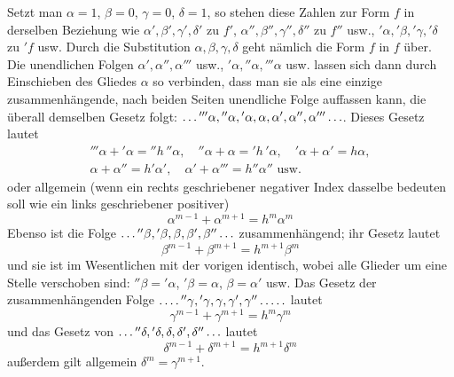 Setzt man $\alpha=1$, $\beta=0$, $\gamma=0$, $\delta=1$, so stehen diese Zahlen zur Form $f$ in derselben Beziehung wie $\alpha',\beta',\gamma',\delta'$ zu $f'$, $\alpha'',\beta'',\gamma'',\delta''$ zu $f''$ usw., ${}'\alpha,{}'\beta,{}'\gamma,{}'\delta$ zu ${}'f$ usw. Durch die Substitution $\alpha,\beta,\gamma,\delta$ geht nämlich die Form $f$ in $f$ über. Die unendlichen Folgen $\alpha',\alpha'',\alpha'''$ usw., ${}'\alpha,{}''\alpha,{}'''\alpha$ usw. lassen sich dann durch Einschieben des Gliedes $\alpha$ so verbinden, dass man sie als eine einzige zusammenhängende, nach beiden Seiten unendliche Folge auffassen kann, die überall demselben Gesetz folgt: $\mathinner{\ldotp\ldotp\ldotp} {}'''\alpha,{}''\alpha,{}'\alpha,\alpha,\alpha',\alpha'',\alpha'''\mathinner{\ldotp\ldotp\ldotp}$. Dieses Gesetz lautet
\[
\begin{gathered}
{}'''\alpha+{}'\alpha={}''h\,{}''\alpha,\quad {}''\alpha+\alpha={}'h\,{}'\alpha,\quad {}'\alpha+\alpha'=h\alpha,\\
\alpha+\alpha''=h'\alpha',\quad \alpha'+\alpha'''=h''\alpha''\text{ usw.}
\end{gathered}
\]
oder allgemein (wenn ein rechts geschriebener negativer Index dasselbe bedeuten soll wie ein links geschriebener positiver)
\[
\alpha^{m-1}+\alpha^{m+1}=h^m{\alpha^m}
\]
Ebenso ist die Folge $\mathinner{\ldotp\ldotp\ldotp} {}''\beta,{}'\beta,\beta,\beta',\beta''\mathinner{\ldotp\ldotp\ldotp}$ zusammenhängend; ihr Gesetz lautet
\[
\beta^{m-1}+\beta^{m+1}=h^{m+1}\beta^m
\]
und sie ist im Wesentlichen mit der vorigen identisch, wobei alle Glieder um eine Stelle verschoben sind: ${}''\beta={}'\alpha$, ${}'\beta=\alpha$, $\beta=\alpha'$ usw. Das Gesetz der zusammenhängenden Folge $\mathinner{\ldotp\ldotp\ldotp\ldotp} {}''\gamma,\allowbreak {}'\gamma,\allowbreak \gamma,\allowbreak \gamma',\allowbreak \gamma''\mathinner{\ldotp\ldotp\ldotp\ldotp\ldotp}$ lautet
\[
\gamma^{m-1}+\gamma^{m+1}=h^m{\gamma^m}
\]
und das Gesetz von $\mathinner{\ldotp\ldotp\ldotp} {}''\delta,{}'\delta,\delta,\delta',\delta''\mathinner{\ldotp\ldotp\ldotp}$ lautet
\[
\delta^{m-1}+\delta^{m+1}=h^{m+1}\delta^m
\]
außerdem gilt allgemein $\delta^m=\gamma^{m+1}$.

